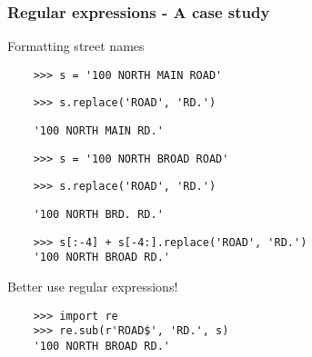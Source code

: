 \begin{frame}[fragile]
  \frametitle{Regular expressions - A case study}
  Formatting street names
  \vspace{0.4cm}
  \begin{verbatim}
    >>> s = '100 NORTH MAIN ROAD'
  \end{verbatim}
  \pause
  \vspace{-10pt}
  \begin{verbatim} 
    >>> s.replace('ROAD', 'RD.')
  \end{verbatim}
  \pause
  \vspace{-10pt}
  \begin{verbatim} 
    '100 NORTH MAIN RD.'
  \end{verbatim}
  \pause
  \vspace{-10pt}
  \begin{verbatim} 
    >>> s = '100 NORTH BROAD ROAD'
  \end{verbatim}
  \pause
  \vspace{-10pt}
  \begin{verbatim}
    >>> s.replace('ROAD', 'RD.') 
  \end{verbatim}
  \pause
  \vspace{-10pt}
  \begin{verbatim}
    '100 NORTH BRD. RD.'
  \end{verbatim}
  \pause
  \vspace{-10pt}
  \begin{verbatim} 
    >>> s[:-4] + s[-4:].replace('ROAD', 'RD.') 
    '100 NORTH BROAD RD.'
  \end{verbatim}

  \vspace{0.3cm}
  Better use regular expressions!

  \begin{verbatim}
    >>> import re 
    >>> re.sub(r'ROAD$', 'RD.', s) 
    '100 NORTH BROAD RD.'
  \end{verbatim}


\end{frame}

